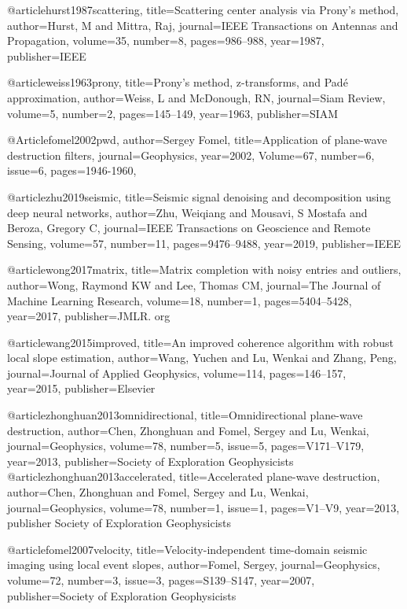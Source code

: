@article{hurst1987scattering,
  title={Scattering center analysis via Prony's method},
  author={Hurst, M and Mittra, Raj},
  journal={IEEE Transactions on Antennas and Propagation},
  volume={35},
  number={8},
  pages={986--988},
  year={1987},
  publisher={IEEE}
}

@article{weiss1963prony,
  title={Prony’s method, z-transforms, and Pad{\'e} approximation},
  author={Weiss, L and McDonough, RN},
  journal={Siam Review},
  volume={5},
  number={2},
  pages={145--149},
  year={1963},
  publisher={SIAM}
}



@Article{fomel2002pwd,
  author={Sergey Fomel},
  title={Application of plane-wave destruction filters},
  journal={Geophysics},
  year=2002,
  Volume=67,
  number=6,
  issue=6,
  pages={1946-1960},
}

@article{zhu2019seismic,
  title={Seismic signal denoising and decomposition using deep neural networks},
  author={Zhu, Weiqiang and Mousavi, S Mostafa and Beroza, Gregory C},
  journal={IEEE Transactions on Geoscience and Remote Sensing},
  volume={57},
  number={11},
  pages={9476--9488},
  year={2019},
  publisher={IEEE}
}



@article{wong2017matrix,
  title={Matrix completion with noisy entries and outliers},
  author={Wong, Raymond KW and Lee, Thomas CM},
  journal={The Journal of Machine Learning Research},
  volume={18},
  number={1},
  pages={5404--5428},
  year={2017},
  publisher={JMLR. org}
}


@article{wang2015improved,
  title={An improved coherence algorithm with robust local slope estimation},
  author={Wang, Yuchen and Lu, Wenkai and Zhang, Peng},
  journal={Journal of Applied Geophysics},
  volume={114},
  pages={146--157},
  year={2015},
  publisher={Elsevier}
}

@article{zhonghuan2013omnidirectional,
  title={Omnidirectional plane-wave destruction},
  author={Chen, Zhonghuan and Fomel, Sergey and Lu, Wenkai},
  journal={Geophysics},
  volume={78},
  number={5},
  issue=5,
  pages={V171--V179},
  year={2013},
  publisher={Society of Exploration Geophysicists}
}
@article{zhonghuan2013accelerated,
  title={Accelerated plane-wave destruction},
  author={Chen, Zhonghuan and Fomel, Sergey and Lu, Wenkai},
  journal={Geophysics},
  volume={78},
  number={1},
  issue=1,
  pages={V1--V9},
  year={2013},
  publisher {Society of Exploration Geophysicists}
}

@article{fomel2007velocity,
  title={Velocity-independent time-domain seismic imaging using local event slopes},
  author={Fomel, Sergey},
  journal={Geophysics},
  volume={72},
  number={3},
  issue=3,
  pages={S139--S147},
  year={2007},
  publisher={Society of Exploration Geophysicists}
}


